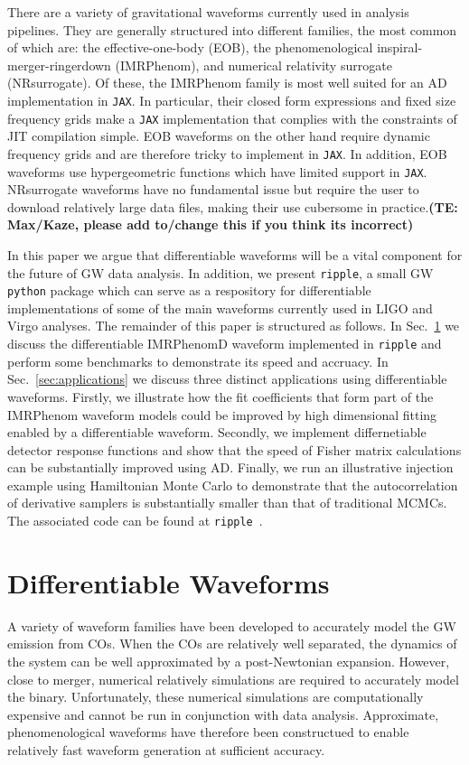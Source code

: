 \documentclass[twocolumn]{aastex631}
\newcommand{\jax}{\texttt{JAX}\xspace}
\newcommand{\ripple}{\texttt{ripple}\xspace}
\newcommand{\te}[1]{\textbf{\color{pyGreen}(TE: #1)}}
\begin{document}
There are a variety of gravitational waveforms currently used in analysis pipelines.
They are generally structured into different families, the most common of which are: the effective-one-body (EOB), the phenomenological inspiral-merger-ringerdown (IMRPhenom), and numerical relativity surrogate (NRsurrogate).
Of these, the IMRPhenom family is most well suited for an AD implementation in \jax.
In particular, their closed form expressions and fixed size frequency grids make a \jax implementation that complies with the constraints of JIT compilation simple.
EOB waveforms on the other hand require dynamic frequency grids and are therefore tricky to implement in \jax. 
In addition, EOB waveforms use hypergeometric functions which have limited support in \jax.
NRsurrogate waveforms have no fundamental issue but require the user to download relatively large data files, making their use cubersome in practice.\te{Max/Kaze, please add to/change this if you think its incorrect}

In this paper we argue that differentiable waveforms will be a vital component for the future of GW data analysis.
In addition, we present \ripple, a small GW \texttt{python} package which can serve as a respository for differentiable implementations of some of the main waveforms currently used in LIGO and Virgo analyses. 
The remainder of this paper is structured as follows. 
In Sec.~\ref{sec:waveforms} we discuss the differentiable IMRPhenomD waveform implemented in \ripple and perform some benchmarks to demonstrate its speed and accruacy. 
In Sec.~\ref{sec:applications} we discuss three distinct applications using differentiable waveforms. 
Firstly, we illustrate how the fit coefficients that form part of the IMRPhenom waveform models could be improved by high dimensional fitting enabled by a differentiable waveform. 
Secondly, we implement differnetiable detector response functions and show that the speed of Fisher matrix calculations can be substantially improved using AD.
Finally, we run an illustrative injection example using Hamiltonian Monte Carlo to demonstrate that the autocorrelation of derivative samplers is substantially smaller than that of traditional MCMCs.
The associated code can be found at \ripple~\citep{ripple}.

\section{Differentiable Waveforms}
\label{sec:waveforms}

A variety of waveform families have been developed to accurately model the GW emission from COs. 
When the COs are relatively well separated, the dynamics of the system can be well approximated by a post-Newtonian expansion.
However, close to merger, numerical relatively simulations are required to accurately model the binary.
Unfortunately, these numerical simulations are computationally expensive and cannot be run in conjunction with data analysis.
Approximate, phenomenological waveforms have therefore been constructued to enable relatively fast waveform generation at sufficient accuracy.
\end{document}

